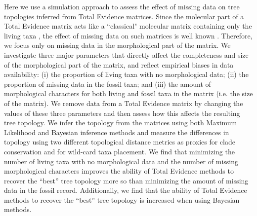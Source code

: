 Here we use a simulation approach to assess the effect of missing data on tree topologies inferred from Total Evidence matrices.
Since the molecular part of a Total Evidence matrix acts like a ``classical" molecular matrix containing only the living taxa \citep{ronquista2012}, the effect of missing data on such matrices is well known \citep{wiensmissing2006,wiensmissing2008,lemmonthe2009,rouresite-specific2011}.
Therefore, we focus only on missing data in the morphological part of the matrix.
We investigate three major parameters that directly affect the completeness and size of the morphological part of the matrix, and reflect empirical biases in data availability: (i) the proportion of living taxa with no morphological data; (ii) the proportion of missing data in the fossil taxa; and (iii) the amount of morphological characters for both living and fossil taxa in the matrix (i.e. the size of the matrix).
We remove data from a Total Evidence matrix by changing the values of these three parameters and then assess how this affects the resulting tree topology.
We infer the topology from the matrices using both Maximum Likelihood and Bayesian inference methods and measure the differences in topology using two different topological distance metrics as proxies for clade conservation and for wild-card taxa placement.
We find that minimizing the number of living taxa with no morphological data and the number of missing morphological characters improves the ability of Total Evidence methods to recover the ``best'' tree topology more so than minimizing the amount of missing data in the fossil record.
Additionally, we find that the ability of Total Evidence methods to recover the ``best'' tree topology is increased when using Bayesian methods.



%
%
 
